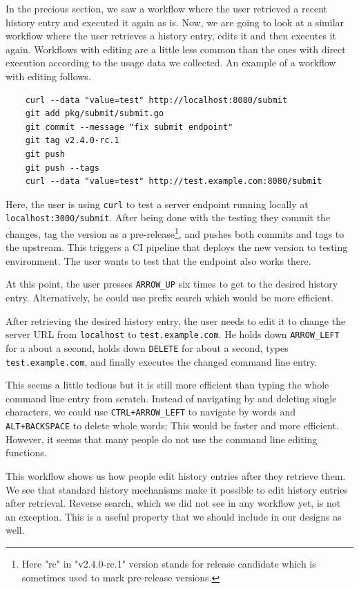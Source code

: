 \documentclass[thesis=M,english]{FITthesis}[2012/10/20]
\begin{document}
In the precious section, we saw a workflow where the user retrieved a recent history entry and executed it again as is. Now, we are going to look at a similar workflow where the user retrieves a history entry, edits it and then executes it again. Workflows with editing are a little less common than the ones with direct execution according to the usage data we collected. An example of a workflow with editing follows.

\begin{verbatim}
    curl --data "value=test" http://localhost:8080/submit
    git add pkg/submit/submit.go
    git commit --message "fix submit endpoint"
    git tag v2.4.0-rc.1
    git push
    git push --tags
    curl --data "value=test" http://test.example.com:8080/submit
\end{verbatim}


Here, the user is using \verb|curl| to test a server endpoint running locally at \verb|localhost:3000/submit|.  After being done with the testing they commit the changes, tag the version as a pre-release\footnote{Here "rc" in "v2.4.0-rc.1" version stands for release candidate which is sometimes used to mark pre-release versions.}, and pushes both commits and tags to the upstream. This triggers a CI pipeline that deploys the new version to testing environment. The user wants to test that the endpoint also works there.

At this point, the user presses \verb|ARROW_UP| six times to get to the desired history entry. Alternatively, he could use prefix search which would be more efficient.

After retrieving the desired history entry, the user needs to edit it to change the server URL from \verb|localhost| to \verb|test.example.com|. He holds down \verb|ARROW_LEFT| for a about a second, holds down \verb|DELETE| for about a second, types \verb|test.example.com|, and finally executes the changed command line entry. 

This seems a little tedious but it is still more efficient than typing the whole command line entry from scratch. Instead of navigating by and deleting single characters, we could use \verb|CTRL+ARROW_LEFT| to navigate by words and \verb|ALT+BACKSPACE| to delete whole words; This would be faster and more efficient. However, it seems that many people do not use the command line editing functions.

This workflow shows us how people edit history entries after they retrieve them. We see that standard history mechanisms make it possible to edit history entries after retrieval. Reverse search, which we did not see in any workflow yet, is not an exception. This is a useful property that we should include in our designs as well. 
\end{document}
